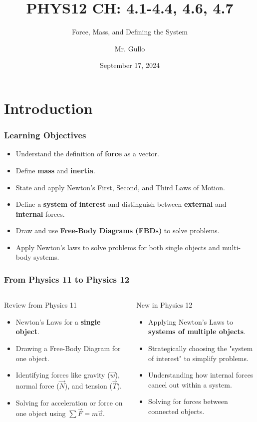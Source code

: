 \documentclass{beamer}
\title[Newton's Laws and Systems]{PHYS12 CH: 4.1-4.4, 4.6, 4.7}
\subtitle{Force, Mass, and Defining the System}
\author[Mr. Gullo]{Mr. Gullo}
\date[Sep 2024]{September 17, 2024}
\begin{document}
\frame{\titlepage}

\section{Introduction}

\begin{frame}
\frametitle{Learning Objectives}
\begin{itemize}
    \item Understand the definition of \textbf{force} as a vector. \pause
    \item Define \textbf{mass} and \textbf{inertia}. \pause
    \item State and apply Newton's First, Second, and Third Laws of Motion. \pause
    \item Define a \textbf{system of interest} and distinguish between \textbf{external} and \textbf{internal} forces. \pause
    \item Draw and use \textbf{Free-Body Diagrams (FBDs)} to solve problems. \pause
    \item Apply Newton's laws to solve problems for both single objects and multi-body systems.
\end{itemize}
\end{frame}

\begin{frame}
\frametitle{From Physics 11 to Physics 12}
\begin{columns}[T]
\begin{alertblock}{Review from Physics 11}
\begin{itemize}
    \item Newton's Laws for a \textbf{single object}.
    \item Drawing a Free-Body Diagram for one object.
    \item Identifying forces like gravity ($\vec{w}$), normal force ($\vec{N}$), and tension ($\vec{T}$).
    \item Solving for acceleration or force on one object using $\sum \vec{F} = m\vec{a}$.
\end{itemize}
\end{alertblock}

\begin{exampleblock}{New in Physics 12}
\begin{itemize}
    \item Applying Newton's Laws to \textbf{systems of multiple objects}.
    \item Strategically choosing the "system of interest" to simplify problems.
    \item Understanding how internal forces cancel out within a system.
    \item Solving for forces between connected objects.
\end{itemize}
\end{exampleblock}
\end{columns}
\end{frame}
\end{document}
